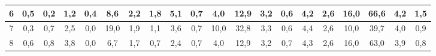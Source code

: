 \begin{sidewaystable}[]
\begin{tabular}{|c|c|c|c|c|c|c|c|c|c|c|c|c|c|c|c|c|c|c|c|}
    6  & 0,5                                             & 0,2                                             & 1,2                                             & 0,4                                             & 8,6                                              & 2,2                                              & 1,8                                              & 5,1                                              & 0,7                                              & 4,0                                              & 12,9                                             & 3,2                                              & 0,6                                              & 4,2                                              & 2,6                                              & 16,0                                             & 66,6                                             & 4,2                                              & 1,5                                              \\ \hline
    7  & 0,3                                             & 0,7                                             & 2,5                                             & 0,0                                             & 19,0                                             & 1,9                                              & 1,1                                              & 3,6                                              & 0,7                                              & 10,0                                             & 32,8                                             & 3,3                                              & 0,6                                              & 4,4                                              & 2,6                                              & 10,0                                             & 39,7                                             & 4,0                                              & 0,9                                              \\ \hline
    8  & 0,6                                             & 0,8                                             & 3,8                                             & 0,0                                             & 6,7                                              & 1,7                                              & 0,7                                              & 2,4                                              & 0,7                                              & 4,0                                              & 12,9                                             & 3,2                                              & 0,7                                              & 4,3                                              & 2,6                                              & 16,0                                             & 63,0                                             & 3,9                                              & 0,8                                              \\ \hline

\end{tabular}
\end{sidewaystable}
